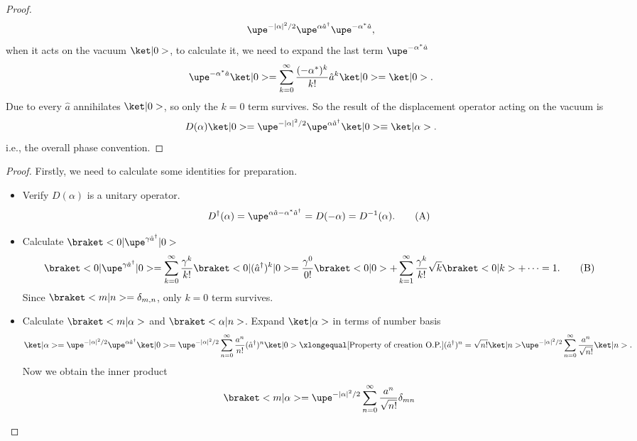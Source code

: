 \begin{solution}
\begin{enumext}
\begin{proof}
\[      \upe^{-|\alpha|^2/2} \upe^{\alpha \hat a^\dagger} \upe^{-\alpha^* \hat a},
    \]
    when it acts on the vacuum $\ket|0>$, to calculate it, we need to expand
    the last term $\upe^{-\alpha^* \hat a}$
    \[
      \upe^{-\alpha^* \hat a} \ket|0> = \sum_{k=0}^\infty \frac{(-\alpha^*)^k}{k!} \hat a^k \ket|0> = \ket|0>.
    \]
    Due to every $\hat a$ annihilates $\ket|0>$, so only the $k = 0$ term survives. So the result of the displacement operator acting on the vacuum is
    \[
      D(\alpha) \ket|0> = \upe^{-|\alpha|^2/2} \upe^{\alpha \hat a^\dagger} \ket|0> \equiv \ket|\alpha>.
    \]
    i.e., the overall phase convention.
    \end{proof}
    \item \begin{proof}
    Firstly, we need to calculate some identities for preparation.
    \begin{itemize}
      \item Verify $D(\alpha)$ is a unitary operator.
      \begin{equation}
        D^\dagger(\alpha) = \upe^{\alpha \hat a - \alpha^*\hat a^\dagger}
      = D(-\alpha) = D^{-1}(\alpha).\tag{A}
      \label{problem:2.4:A}
      \end{equation}
      \item Calculate $\braket<0|\upe^{\gamma \hat a^\dagger}|0>$
      \begin{equation}
        \braket<0|\upe^{\gamma \hat a^\dagger}|0>
      = \sum_{k=0}^\infty \frac{\gamma^k}{k!}\braket<0|(\hat a^\dagger)^k|0>
      = \frac{\gamma^0}{0!}\braket<0|0>
      + \sum_{k=1}^\infty \frac{\gamma^k}{k!} \sqrt{k} \braket<0|k> + \cdots
      = 1.\tag{B}
        \label{problem:2.4:B}
      \end{equation}
      Since $\braket<m|n> = \delta_{m,n}$, only $k = 0$ term survives.
      \item Calculate $\braket<m|\alpha>$ and $\braket<\alpha|n>$.
      Expand $\ket|\alpha>$ in terms of number basis
      \[
        \ket|\alpha> = \upe^{-|\alpha|^2/2} \upe^{\alpha \hat a^\dagger} \ket|0>
      = \upe^{-|\alpha|^2/2} \sum_{n=0}^\infty
        \frac{a^n}{n!} (\hat a^\dagger)^n \ket|0>
      \xlongequal[\text{Property of creation O.P.}]{(\hat a^\dagger)^n = \sqrt{n!}\ket|n>}
        \upe^{-|\alpha|^2/2} \sum_{n=0}^\infty
        \frac{a^n}{\sqrt{n!}} \ket|n>. 
      \]
      Now we obtain the inner product
      \begin{equation}
        \braket<m|\alpha> = \upe^{-|\alpha|^2/2} \sum_{n=0}^\infty
        \frac{a^n}{\sqrt{n!}} \delta_{mn}

\end{equation}
\end{itemize}
\end{proof}
\end{enumext}
\end{solution}
